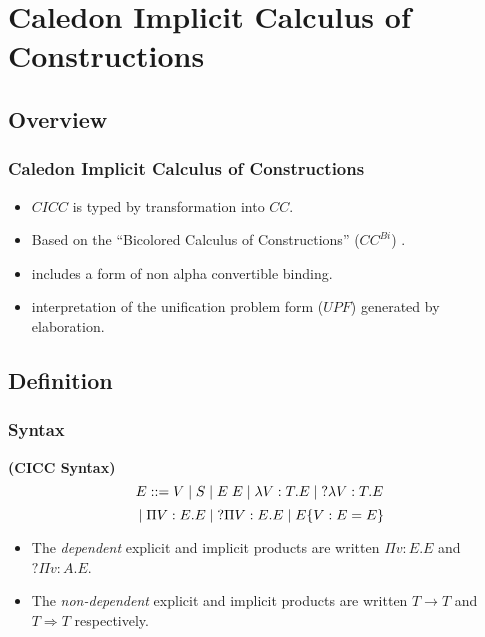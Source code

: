 \section[$CICC$]{Caledon Implicit Calculus of Constructions}


\subsection{Overview}

\begin{frame}
\frametitle{Caledon Implicit Calculus of Constructions}
\begin{itemize}
\item $CICC$ is typed by transformation into $CC$.
\item Based on the ``Bicolored Calculus of Constructions'' ($CC^{Bi}$) \citep{luther2001more}.
\item includes a form of non alpha convertible binding.
\item interpretation of the unification problem form ($UPF$) generated by elaboration.
\end{itemize}
\end{frame}




\subsection{Definition}

\begin{frame}
\frametitle{Syntax}
\begin{definition}
\textbf{(CICC Syntax)}
\[ 
E ::= 
V 
\; | \; S 
\; | \; E\;E 
\; | \; \lambda V : T. E 
\; | \; ?\lambda V : T. E 
\]\[
\; | \; \Pi V : E . E 
\; | \; ?\Pi V : E . E 
\; | \; E \{ V : E = E \}
\]

\end{definition}

\begin{itemize}
\item The \textit{dependent} explicit and implicit products are written $\Pi v : E . E $ and $?\Pi v : A . E$. 
\item The \textit{non-dependent} explicit and implicit products are written $T \rightarrow T$ 
      and $T \Rightarrow T$ respectively.
\end{itemize}
\end{frame}


